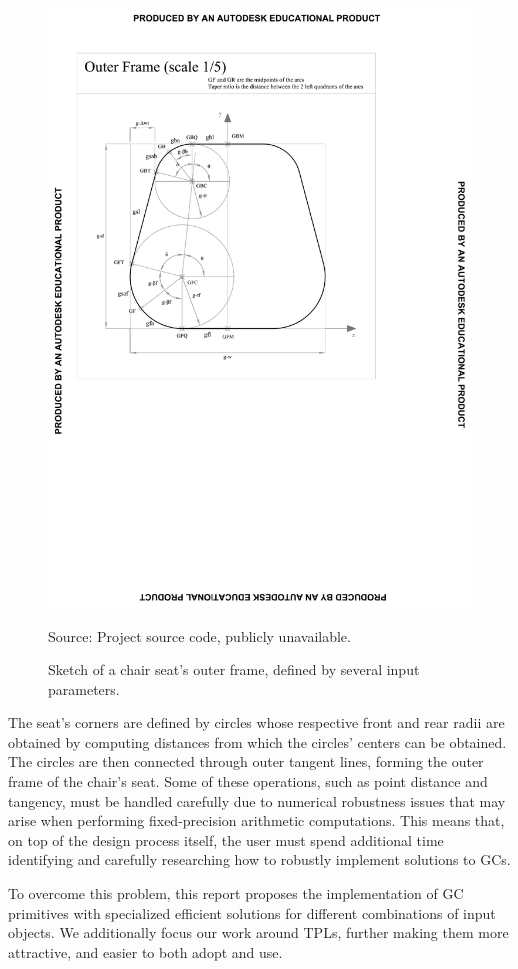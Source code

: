 \begin{figure}[htb]
  \includegraphics[width=.7\linewidth]{fig/chair-seat-outer-frame}
  \begin{minipage}{\linewidth}
  \scriptsize Source: Project source code, publicly unavailable.
  \end{minipage}
  \caption[Sketch of a chair seat's outer frame]{\label{fig:intro.chair}
    Sketch of a chair seat's outer frame, defined by several input parameters.}
\end{figure}

The seat's corners are defined by circles whose respective front and rear radii
are obtained by computing distances from which the circles' centers can be
obtained.  The circles are then connected through outer tangent lines, forming
the outer frame of the chair's seat.  Some of these operations, such as point
distance and tangency, must be handled carefully due to numerical robustness
issues that may arise when performing fixed-precision arithmetic computations.
This means that, on top of the design process itself, the user must spend
additional time identifying and carefully researching how to robustly implement
solutions to \acp{GC}.

To overcome this problem, this report proposes the implementation of \ac{GC}
primitives with specialized efficient solutions for different combinations of
input objects.  We additionally focus our work around \acp{TPL}, further making
them more attractive, and easier to both adopt and use.





